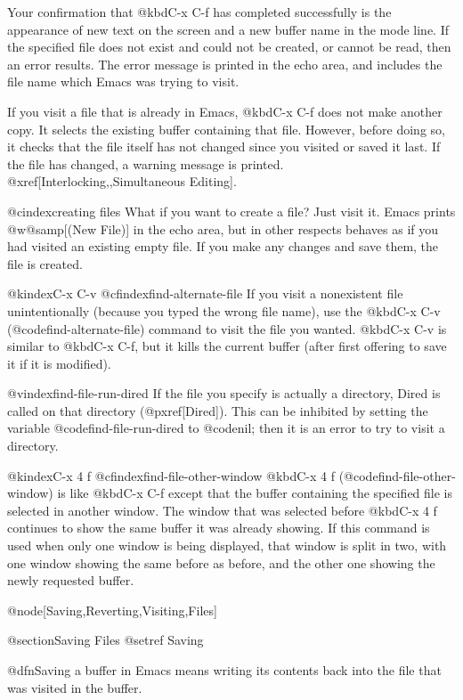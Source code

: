 {{{{{{{{{{{{{{{{{{  Your confirmation that @kbd{C-x C-f} has completed successfully is the
appearance of new text on the screen and a new buffer name in the mode
line.  If the specified file does not exist and could not be created, or
cannot be read, then an error results.  The error message is printed in
the echo area, and includes the file name which Emacs was trying to visit.

  If you visit a file that is already in Emacs, @kbd{C-x C-f} does not
make another copy.  It selects the existing buffer containing that file.
However, before doing so, it checks that the file itself has not changed
since you visited or saved it last.  If the file has changed, a warning
message is printed.  @xref[Interlocking,,Simultaneous Editing].

@cindex{creating files}
  What if you want to create a file?  Just visit it.  Emacs prints
@w{@samp[(New File)]} in the echo area, but in other respects behaves as if
you had visited an existing empty file.  If you make any changes and save
them, the file is created.

@kindex{C-x C-v}
@cfindex{find-alternate-file}
  If you visit a nonexistent file unintentionally (because you typed the
wrong file name), use the @kbd{C-x C-v} (@code{find-alternate-file})
command to visit the file you wanted.  @kbd{C-x C-v} is similar to @kbd{C-x
C-f}, but it kills the current buffer (after first offering to save it
if it is modified).

@vindex{find-file-run-dired}
  If the file you specify is actually a directory, Dired is called on that
directory (@pxref[Dired]).  This can be inhibited by setting the variable
@code{find-file-run-dired} to @code{nil}; then it is an error to try to
visit a directory.

@kindex{C-x 4 f}
@cfindex{find-file-other-window}
  @kbd{C-x 4 f} (@code{find-file-other-window}) is like @kbd{C-x C-f} except
that the buffer containing the specified file is selected in another window.
The window that was selected before @kbd{C-x 4 f}
continues to show the same buffer it was already showing.  If this command
is used when only one window is being displayed, that window is split in two,
with one window showing the same before as before, and the other one
showing the newly requested buffer.

@node[Saving,Reverting,Visiting,Files]

@section{Saving Files}
@setref Saving

  @dfn{Saving} a buffer in Emacs means writing its contents back into the file
that was visited in the buffer.

}}}}}}}}}}}}}}}}}}
